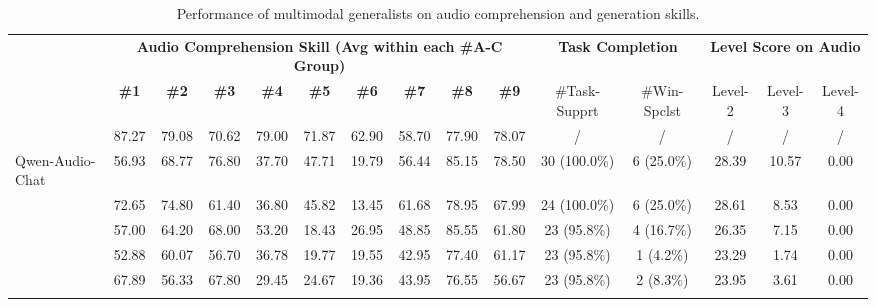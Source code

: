 \documentclass[letterpaper]{article} %
\begin{document}
{
\begin{table*}[t!]
\centering
  \fontsize{7.5}{8}\selectfont 
  \setlength{\tabcolsep}{1mm}
\caption{
Performance of multimodal generalists on audio comprehension and generation skills.
}
\vspace{-2mm}
\label{tab:main-overall-results-audio}
\begin{tabular}{p{2.2cm} ccccccccc cc ccc}
\toprule
\rowcolor{bg-tb-heavey-audio} & \multicolumn{9}{c}{\bf \textcolor{greenCom}{Audio Comprehension Skill (Avg within each \#A-C Group)}} & \multicolumn{2}{c}{\bf Task Completion} & \multicolumn{3}{c}{\bf Level Score on Audio} \\ 

\rowcolor{bg-tb-heavey-audio} \multicolumn{1}{c}{\multirow{-2}{*}{\bf  Model}}  &  \bf\#1 & \bf\#2 & \bf\#3 & \bf\#4 & \bf\#5 & \bf\#6 & \bf\#7 & \bf\#8 & \bf\#9  & 
\multirow{1}{*}{\parbox{1.6cm}{\#Task-Supprt}} & \multirow{1}{*}{\parbox{1.6cm}{\#Win-Spclst}} & \multirow{-1}{*}{Level-2}  & \multirow{-1}{*}{Level-3}  & \multirow{-1}{*}{Level-4}  \\
  \midrule

\rowcolor{bg-tb-light-audio} \multirow{-1}{*}{\bf SoTA Specialist} & 87.27 & 79.08 & 70.62 & 79.00 & 71.87 & 62.90 & 58.70 & 77.90 & 78.07 & / & / & / & / & / \\

\midrule\midrule


\multirow{1}{*}{ Qwen-Audio-Chat} & 56.93 & 68.77 & 76.80 & 37.70 & 47.71 & 19.79 & 56.44 & 85.15 & 78.50 & 30 (100.0\%) & 6 (25.0\%) & 28.39 & 10.57 & 0.00 \\
\addlinespace[4pt]


\rowcolor{bg-tb-light-audio} \multirow{1}{*}{ Qwen2-Audio-Instruct} & 72.65 & 74.80 & 61.40 & 36.80 & 45.82 & 13.45 & 61.68 & 78.95 & 67.99 & 24 (100.0\%) & 6 (25.0\%) & 28.61 & 8.53 & 0.00 \\
\addlinespace[4pt]

\multirow{1}{*}{ GAMA} & 57.00 & 64.20 & 68.00 & 53.20 & 18.43 & 26.95 & 48.85 & 85.55 & 61.80 & 23 (95.8\%) & 4 (16.7\%) & 26.35 & 7.15 & 0.00 \\
\addlinespace[4pt]

\rowcolor{bg-tb-light-audio} \multirow{1}{*}{ Pengi} & 52.88 & 60.07 & 56.70 & 36.78 & 19.77 & 19.55 & 42.95 & 77.40 & 61.17 & 23 (95.8\%) & 1 (4.2\%) & 23.29 & 1.74 & 0.00 \\
\addlinespace[4pt]
 

\multirow{1}{*}{ SALMONN-13B} & 67.89 & 56.33 & 67.80 & 29.45 & 24.67 & 19.36 & 43.95 & 76.55 & 56.67 & 23 (95.8\%) & 2 (8.3\%) & 23.95 & 3.61 & 0.00 \\
\addlinespace[4pt]



\end{tabular}
\end{table*}}
\end{document}

